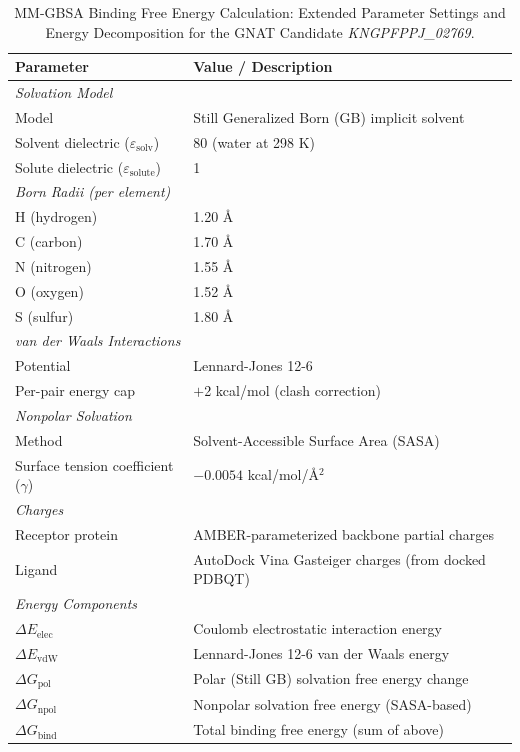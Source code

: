 \documentclass[review,11pt]{article}
\begin{document}
\begin{table}[H]
\centering
\caption{MM-GBSA Binding Free Energy Calculation: Extended Parameter Settings and Energy Decomposition for the GNAT Candidate \textit{KNGPFPPJ\_02769}.}
\label{tab:mmgbsa_params}
\begin{tabular}{ll}
\toprule
\textbf{Parameter} & \textbf{Value / Description} \\
\midrule
\multicolumn{2}{l}{\textit{Solvation Model}} \\
\quad Model & Still Generalized Born (GB) implicit solvent \\
\quad Solvent dielectric ($\varepsilon_{\text{solv}}$) & 80 (water at 298 K) \\
\quad Solute dielectric ($\varepsilon_{\text{solute}}$) & 1 \\
\midrule
\multicolumn{2}{l}{\textit{Born Radii (per element)}} \\
\quad H (hydrogen) & 1.20 \AA \\
\quad C (carbon) & 1.70 \AA \\
\quad N (nitrogen) & 1.55 \AA \\
\quad O (oxygen) & 1.52 \AA \\
\quad S (sulfur) & 1.80 \AA \\
\midrule
\multicolumn{2}{l}{\textit{van der Waals Interactions}} \\
\quad Potential & Lennard-Jones 12-6 \\
\quad Per-pair energy cap & $+$2 kcal/mol (clash correction) \\
\midrule
\multicolumn{2}{l}{\textit{Nonpolar Solvation}} \\
\quad Method & Solvent-Accessible Surface Area (SASA) \\
\quad Surface tension coefficient ($\gamma$) & $-0.0054$ kcal/mol/\AA$^2$ \\
\midrule
\multicolumn{2}{l}{\textit{Charges}} \\
\quad Receptor protein & AMBER-parameterized backbone partial charges \\
\quad Ligand & AutoDock Vina Gasteiger charges (from docked PDBQT) \\
\midrule
\multicolumn{2}{l}{\textit{Energy Components}} \\
\quad $\Delta E_{\text{elec}}$ & Coulomb electrostatic interaction energy \\
\quad $\Delta E_{\text{vdW}}$ & Lennard-Jones 12-6 van der Waals energy \\
\quad $\Delta G_{\text{pol}}$ & Polar (Still GB) solvation free energy change \\
\quad $\Delta G_{\text{npol}}$ & Nonpolar solvation free energy (SASA-based) \\
\quad $\Delta G_{\text{bind}}$ & Total binding free energy (sum of above) \\
\bottomrule
\end{tabular}
\end{table}
\end{document}
